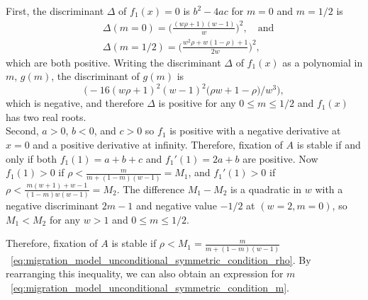 \documentclass[14pt]{extarticle}
\begin{document}
First, the discriminant $\Delta$ of $f_1(x)=0$ is $b^2-4ac$ for $m=0$ and $m=1/2$ is
\begin{equation}\begin{aligned}
&\Delta(m=0) = \Big(\frac{(w \rho + 1) (w-1)}{w}\Big)^2, \quad \text{and} \\
&\Delta(m=1/2) = \Big(\frac{w^2 \rho + w(1-\rho) + 1}{2 w}\Big)^2,
\end{aligned}\end{equation}
which are both positive. 
Writing the discriminant $\Delta$ of $f_1(x)$ as a polynomial in $m$, $g(m)$, the discriminant of $g(m)$ is
$$
\big(- 16 (w\rho + 1)^2 (w - 1)^2 \big(\rho w + 1 - \rho \big) / w^3\big),
$$
which is negative, and therefore $\Delta$ is positive for any $0 \le m \le 1/2$ and $f_1(x)$ has two real roots. \\
Second, $a>0$, $b<0$, and $c>0$ so $f_1$ is positive with a negative derivative at $x=0$ and  a positive derivative at infinity.
Therefore, fixation of $A$ is stable if and only if both $f_1(1)=a+b+c$ and $f_1'(1)=2a+b$ are positive.
Now $f_1(1)>0$  if $\rho < \frac{m}{m+(1-m)(w-1)}=M_1$, and
$f_1'(1)>0$  if $\rho < \frac{m(w+1)+w-1}{(1-m)w(w-1)}=M_2$.
The difference $M_1-M_2$ is a quadratic in $w$ with a negative discriminant $2m-1$ and negative value $-1/2$ at $(w=2, m=0)$, so $M_1<M_2$ for any $w>1$ and $0 \le m \le 1/2$.

Therefore, fixation of $A$ is stable if $\rho < M_1 = \frac{m}{m+(1-m)(w-1)}$~\eqref{eq:migration_model_unconditional_symmetric_condition_rho}. By rearranging this inequality, we can also obtain an expression for $m$~\eqref{eq:migration_model_unconditional_symmetric_condition_m}.
\end{document}
